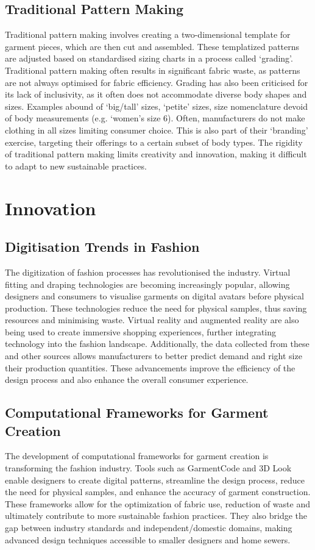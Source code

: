 \subsection{Traditional Pattern Making}
Traditional pattern making involves creating a two-dimensional template for garment pieces, which are then cut and assembled. These templatized patterns are adjusted based on standardised sizing charts in a process called ‘grading’. Traditional pattern making often results in significant fabric waste, as patterns are not always optimised for fabric efficiency. 
Grading has also been criticised for its lack of inclusivity, as it often does not accommodate diverse body shapes and sizes. Examples abound of ‘big/tall’ sizes, ‘petite’ sizes, size nomenclature devoid of body measurements (e.g. ‘women’s size 6). Often, manufacturers do not make clothing in all sizes limiting consumer choice. This is also part of their ‘branding’ exercise, targeting their offerings to a certain subset of body types. The rigidity of traditional pattern making limits creativity and innovation, making it difficult to adapt to new sustainable practices.


\section{Innovation}

\subsection{Digitisation Trends in Fashion}
The digitization of fashion processes has revolutionised the industry. Virtual fitting and draping technologies are becoming increasingly popular, allowing designers and consumers to visualise garments on digital avatars before physical production. These technologies reduce the need for physical samples, thus saving resources and minimising waste. Virtual reality and augmented reality are also being used to create immersive shopping experiences, further integrating technology into the fashion landscape. Additionally, the data collected from these and other sources allows manufacturers to better predict demand and right size their production quantities. These advancements improve the efficiency of the design process and also enhance the overall consumer experience.

\subsection{Computational Frameworks for Garment Creation}
The development of computational frameworks for garment creation is transforming the fashion industry. Tools such as GarmentCode and 3D Look enable designers to create digital patterns, streamline the design process, reduce the need for physical samples, and enhance the accuracy of garment construction.
These frameworks allow for the optimization of fabric use,  reduction of waste and ultimately contribute to more sustainable fashion practices. They also bridge the gap between industry standards and independent/domestic domains, making advanced design techniques accessible to smaller designers and home sewers.


